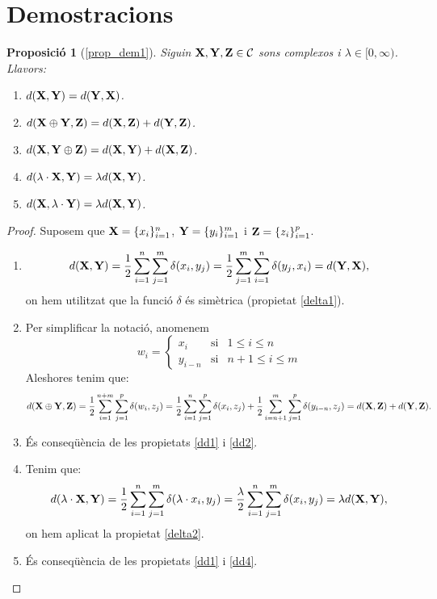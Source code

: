 \documentclass{article}
\theoremstyle{math}
\theoremstyle{TheoremNum}
\newtheorem{prop*}[definition]{Proposició}
\newcommand{\0}{\ensuremath{\vb{0}}}
\newcommand{\X}{\ensuremath{\vb{X}}}
\newcommand{\Y}{\ensuremath{\vb{Y}}}
\newcommand{\Z}{\ensuremath{\vb{Z}}}
\begin{document}
\section{Demostracions}\label{demos}
\begin{prop*}[\ref*{prop_dem1}]
    Siguin $\X,\Y,\Z\in\mathcal{C}$ sons complexos i $\lambda\in[0,\infty)$. Llavors:
    \begin{enumerate}[label=$d$\arabic*),ref=$d$\arabic*]
        \item\label{dd1} $d(\X,\Y)=d(\Y,\X)$.
        \item\label{dd2} $d(\X\oplus\Y,\Z)=d(\X,\Z)+d(\Y,\Z)$.
        \item\label{dd3} $d(\X,\Y\oplus\Z)=d(\X,\Y)+d(\X,\Z)$.
        \item\label{dd4} $d(\lambda\cdot\X,\Y)=\lambda d(\X,\Y)$.
        \item\label{dd5} $d(\X,\lambda\cdot\Y)=\lambda d(\X,\Y)$.
    \end{enumerate}
\end{prop*}
\begin{proof}
    Suposem que $\X=\{x_i\}_{i=1}^n$, $\Y=\{y_i\}_{i=1}^m$ i $\Z=\{z_i\}_{i=1}^p$.
    \begin{enumerate}[label=$d$\arabic*)]
        \item $$d(\X,\Y)=\frac{1}{2}\sum_{i=1}^n\sum_{j=1}^m\delta(x_i,y_j)=\frac{1}{2}\sum_{j=1}^m\sum_{i=1}^n\delta(y_j,x_i)=d(\Y,\X),$$ on hem utilitzat que la funció $\delta$ és simètrica (propietat \ref{delta1}).
        \item Per simplificar la notació, anomenem 
        $$
        w_i=\left\{
        \begin{array}{ccc}
            x_i & \text{si} & 1\leq i\leq n\\
            y_{i-n} & \text{si} & n+1\leq i\leq m
        \end{array}\right.
        $$ Aleshores tenim que: $$d(\X\oplus\Y,\Z)=\frac{1}{2}\sum_{i=1}^{n+m}\sum_{j=1}^p\delta(w_i,z_j)=\frac{1}{2}\sum_{i=1}^n\sum_{j=1}^p\delta(x_i,z_j)+\frac{1}{2}\sum_{i=n+1}^m\sum_{j=1}^p\delta(y_{i-n},z_j)=d(\X,\Z)+d(\Y,\Z).$$
        \item És conseqüència de les propietats \ref{dd1} i \ref{dd2}.
        \item Tenim que: $$d(\lambda\cdot\X,\Y)=\frac{1}{2}\sum_{i=1}^n\sum_{j=1}^m\delta(\lambda\cdot x_i,y_j)=\frac{\lambda}{2}\sum_{i=1}^n\sum_{j=1}^m\delta(x_i,y_j)=\lambda d(\X,\Y),$$ on hem aplicat la propietat \ref{delta2}.
        \item És conseqüència de les propietats \ref{dd1} i \ref{dd4}.
    \end{enumerate}
\end{proof}
\end{document}
